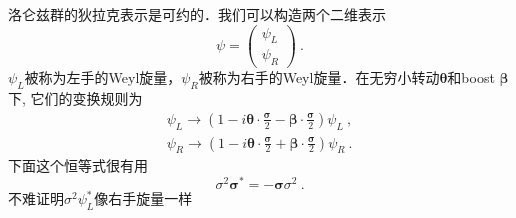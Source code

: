 
洛仑兹群的狄拉克表示是可约的．我们可以构造两个二维表示
\begin{equation}
\psi = \begin{pmatrix}
\psi_L \\
\psi_R
\end{pmatrix}~.
\end{equation}
$\psi_L$被称为左手的Weyl旋量，$\psi_R$被称为右手的Weyl旋量．在无穷小转动$\mathbf \theta$和boost $\mathbf \beta$下, 它们的变换规则为
\begin{align}
\psi_L \rightarrow (1-i \boldsymbol \theta \cdot \frac{\boldsymbol \sigma}{2} - \boldsymbol \beta \cdot \frac{\boldsymbol \sigma}{2})\psi_L ~, \\
\psi_R \rightarrow (1-i\boldsymbol \theta \cdot \frac{\boldsymbol \sigma}{2}+ \boldsymbol \beta \cdot \frac{\boldsymbol \sigma}{2})\psi_R ~.
\end{align}
下面这个恒等式很有用
\begin{equation}
\sigma^2\boldsymbol \sigma^* = - \boldsymbol \sigma \sigma^2~.
\end{equation}
不难证明$\sigma^2\psi^*_L$像右手旋量一样